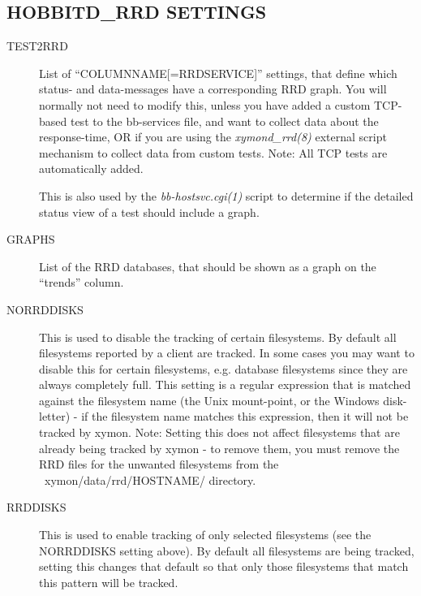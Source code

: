 \subsection{HOBBITD\_RRD SETTINGS}


 \begin{description}
\item[TEST2RRD] List of ``COLUMNNAME[=RRDSERVICE]'' settings, that define which status- and data-messages have a corresponding RRD graph. You will normally not need to modify this, unless you have added a custom TCP-based test to the bb-services file, and want to collect data about the response-time, OR if you are using the \emph{xymond\_rrd(8)}
 external script mechanism to collect data from custom tests. Note: All TCP tests are automatically added. 

  This is also used by the \emph{bb-hostsvc.cgi(1) }
 script to determine if the detailed status view of a test should include a graph. 


 

\item[GRAPHS] List of the RRD databases, that should be shown as a graph on the ``trends'' column. 

 

\item[NORRDDISKS] This is used to disable the tracking of certain filesystems. By default all filesystems reported by a client are tracked. In some cases you may want to disable this for certain filesystems, e.g. database filesystems since they are always completely full. This setting is a regular expression that is matched against the filesystem name (the Unix mount-point, or the Windows disk-letter) - if the filesystem name matches this expression, then it will not be tracked by xymon.  
 Note: Setting this does not affect filesystems that are already being tracked by xymon - to remove them, you must remove the RRD files for the unwanted filesystems from the ~xymon/data/rrd/HOSTNAME/ directory. 

 

\item[RRDDISKS] This is used to enable tracking of only selected filesystems (see the NORRDDISKS setting above). By default all filesystems are being tracked, setting this changes that default so that only those filesystems that match this pattern will be tracked. 

 


 


\end{description}

